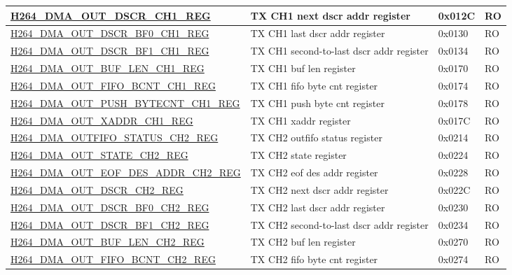 \begin{longtable}{ | p{7.5cm} | p{5.7cm} | p{1.2cm} | p{1.5cm} | }
\hyperref[regdesc:H264DMAOUTDSCRCH1REG]{H264\_DMA\_OUT\_DSCR\_CH1\_REG} & TX CH1 next dscr addr register & 0x012C & RO \\ \hline
\hyperref[regdesc:H264DMAOUTDSCRBF0CH1REG]{H264\_DMA\_OUT\_DSCR\_BF0\_CH1\_REG} & TX CH1 last dscr addr register & 0x0130 & RO \\ \hline
\hyperref[regdesc:H264DMAOUTDSCRBF1CH1REG]{H264\_DMA\_OUT\_DSCR\_BF1\_CH1\_REG} & TX CH1 second-to-last dscr addr register & 0x0134 & RO \\ \hline
\hyperref[regdesc:H264DMAOUTBUFLENCH1REG]{H264\_DMA\_OUT\_BUF\_LEN\_CH1\_REG} & TX CH1 buf len register & 0x0170 & RO \\ \hline
\hyperref[regdesc:H264DMAOUTFIFOBCNTCH1REG]{H264\_DMA\_OUT\_FIFO\_BCNT\_CH1\_REG} & TX CH1 fifo byte cnt register & 0x0174 & RO \\ \hline
\hyperref[regdesc:H264DMAOUTPUSHBYTECNTCH1REG]{H264\_DMA\_OUT\_PUSH\_BYTECNT\_CH1\_REG} & TX CH1 push byte cnt register & 0x0178 & RO \\ \hline
\hyperref[regdesc:H264DMAOUTXADDRCH1REG]{H264\_DMA\_OUT\_XADDR\_CH1\_REG} & TX CH1 xaddr register & 0x017C & RO \\ \hline
\hyperref[regdesc:H264DMAOUTFIFOSTATUSCH2REG]{H264\_DMA\_OUTFIFO\_STATUS\_CH2\_REG} & TX CH2 outfifo status register & 0x0214 & RO \\ \hline
\hyperref[regdesc:H264DMAOUTSTATECH2REG]{H264\_DMA\_OUT\_STATE\_CH2\_REG} & TX CH2 state register & 0x0224 & RO \\ \hline
\hyperref[regdesc:H264DMAOUTEOFDESADDRCH2REG]{H264\_DMA\_OUT\_EOF\_DES\_ADDR\_CH2\_REG} & TX CH2 eof des addr register & 0x0228 & RO \\ \hline
\hyperref[regdesc:H264DMAOUTDSCRCH2REG]{H264\_DMA\_OUT\_DSCR\_CH2\_REG} & TX CH2 next dscr addr register & 0x022C & RO \\ \hline
\hyperref[regdesc:H264DMAOUTDSCRBF0CH2REG]{H264\_DMA\_OUT\_DSCR\_BF0\_CH2\_REG} & TX CH2 last dscr addr register & 0x0230 & RO \\ \hline
\hyperref[regdesc:H264DMAOUTDSCRBF1CH2REG]{H264\_DMA\_OUT\_DSCR\_BF1\_CH2\_REG} & TX CH2 second-to-last dscr addr register & 0x0234 & RO \\ \hline
\hyperref[regdesc:H264DMAOUTBUFLENCH2REG]{H264\_DMA\_OUT\_BUF\_LEN\_CH2\_REG} & TX CH2 buf len register & 0x0270 & RO \\ \hline
\hyperref[regdesc:H264DMAOUTFIFOBCNTCH2REG]{H264\_DMA\_OUT\_FIFO\_BCNT\_CH2\_REG} & TX CH2 fifo byte cnt register & 0x0274 & RO \\ \hline

\end{longtable}
